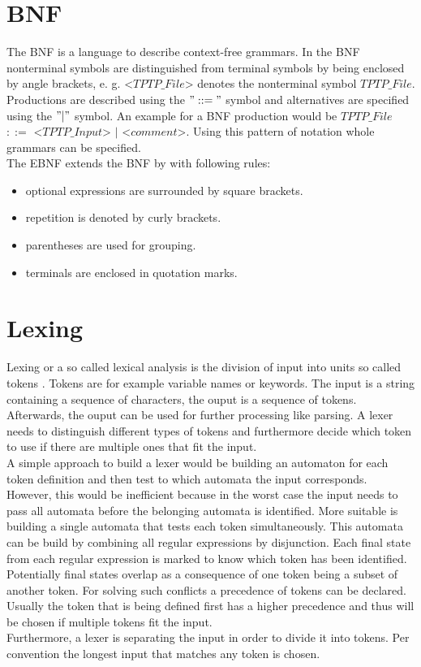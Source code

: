 \section{\acf{BNF}}\label{sec:BackgroundBNF}
The  \acf{BNF} is a language to describe context-free grammars.
In the \acf{BNF} nonterminal symbols are distinguished from terminal symbols by being enclosed by  angle brackets, e. g. <$TPTP\_File$> denotes the nonterminal symbol $TPTP\_File$.
Productions are described using the $"::="$ symbol and alternatives are specified using the $"|"$ symbol. \cite{BNF.1964} 
An example for a \ac{BNF} production would be $TPTP\_File$ $::=$ <$TPTP\_Input$> $|$ <$comment$>.
Using this pattern of notation whole grammars can be specified.\\
The \ac{EBNF} extends the \ac{BNF} by with following rules:

\begin{itemize}%
	\item optional expressions are surrounded by square brackets.
	\item repetition is denoted by curly brackets.
	\item parentheses are used for grouping.
	\item terminals are enclosed in quotation marks.
\end{itemize}
\label{itemize:BackgroundBNF}
\cite{EBNF.1977}

\section{Lexing}\label{sec:BackgroundLexer}
Lexing or a so called lexical analysis is the division of input into units so called tokens \cite{LexYacc.1992}. Tokens are for example variable names or keywords.
The input is a string containing a sequence of characters, the ouput is a sequence of tokens. 
Afterwards, the ouput can be used for further processing like parsing.
A lexer needs to distinguish different types of tokens and furthermore decide which token to use if there are multiple ones that fit the input. \cite{Mogensen.2017}\\
A simple approach to build a lexer would be building an automaton for each token definition and then test to which automata the input corresponds.\\
However, this would be inefficient because in the worst case the input needs to pass all automata before the belonging automata is identified.
More suitable is building a single automata that tests each token simultaneously.
This automata can be build by combining all regular expressions by disjunction.
Each final state from each regular expression is marked to know which token has been identified.\\
Potentially final states overlap as a consequence of one token being a subset of another token.
For solving such conflicts a precedence of tokens can be declared. Usually the token that is being defined first has a higher precedence and thus will be chosen if multiple tokens fit the input. \cite{Mogensen.2017}\\
Furthermore, a lexer is separating the input in order to divide it into tokens.
Per convention the longest input that matches any token is chosen. \cite{Mogensen.2017}

